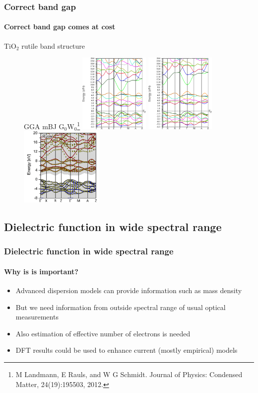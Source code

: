 \documentclass{beamer}
\begin{document}
\begin{frame}
    \frametitle{Correct band gap}
    \framesubtitle{Correct band gap comes at cost}
	TiO$_2$ rutile band structure
	\begin{figure}
	\hspace{0.2cm} GGA \hspace{2.4cm} mBJ \hspace{2.8cm} G$_0$W$_0$\footnote{M Landmann, E Rauls, and W G Schmidt. Journal of Physics: Condensed Matter, 24(19):195503, 2012.}
	\includegraphics[height=3.8cm]{figures/TiO2-rutile-GGA.pdf}
	\includegraphics[height=3.8cm]{figures/TiO2-rutile-mBJ.pdf}
	\includegraphics[height=3.8cm]{figures/TiO2-rutile-GW.png}
	\end{figure}

\end{frame}

\subsection{Dielectric function in wide spectral range}
\begin{frame}
    \frametitle{Dielectric function in wide spectral range}
    \framesubtitle{Why is is important?}

	\begin{itemize}
	\item Advanced dispersion models can provide information such as mass density
	\item But we need information from outside spectral range of usual optical measurements 
	\item Also estimation of effective number of electrons is needed 
	\item DFT results could be used to enhance current (mostly empirical) models
	\end{itemize}	

\end{frame}
\end{document}
